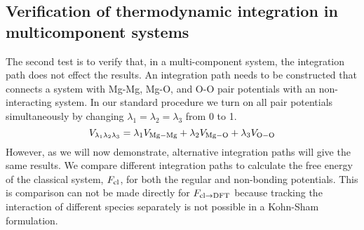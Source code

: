 \subsection{Verification of thermodynamic integration in multicomponent systems}

The second test is to verify that, in a multi-component system, the
integration path does not effect the results. An integration path needs to
be constructed that connects a system with Mg-Mg, Mg-O, and O-O pair
potentials with an non-interacting system. In our standard procedure we
turn on all pair potentials simultaneously by changing
$\lambda_1=\lambda_2=\lambda_3$ from 0 to 1.
%
\begin{equation}
      V_{\lambda_1\lambda_2\lambda_3} = \lambda_1 V_{\rm Mg-Mg} + \lambda_2 V_{\rm
      Mg-O} + \lambda_3 V_{\rm O-O} 
\end{equation}
%
 However, as we will now demonstrate, alternative integration paths will give the
 same results. We compare different integration paths to calculate the free energy of
 the classical system, $F_{\rm cl}$, for both the regular and non-bonding potentials.
 This is comparison can not be made directly for $F_{\rm cl \to DFT}$ because
 tracking the interaction of different species separately is not possible in a
 Kohn-Sham formulation.

